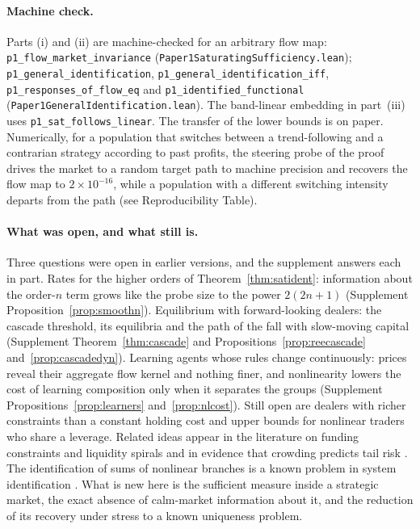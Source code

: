 \documentclass[12pt]{article}
\theoremstyle{definition}
\theoremstyle{remark}
\begin{document}
\paragraph{Machine check.} Parts (i) and (ii) are machine-checked for an arbitrary flow map: \texttt{p1\_flow\_market\_invariance} (\nolinkurl{Paper1SaturatingSufficiency.lean}); \texttt{p1\_general\_identification}, \texttt{p1\_general\_identification\_iff}, \texttt{p1\_responses\_of\_flow\_eq} and \texttt{p1\_identified\_functional} (\nolinkurl{Paper1GeneralIdentification.lean}). The band-linear embedding in part~(iii) uses \texttt{p1\_sat\_follows\_linear}. The transfer of the lower bounds is on paper. Numerically, for a population that switches between a trend-following and a contrarian strategy according to past profits, the steering probe of the proof drives the market to a random target path to machine precision and recovers the flow map to $2\times10^{-16}$, while a population with a different switching intensity departs from the path (see Reproducibility Table).

\paragraph{What was open, and what still is.} Three questions were open in earlier versions, and the supplement answers each in part. Rates for the higher orders of Theorem~\ref{thm:satident}: information about the order-$n$ term grows like the probe size to the power $2(2n+1)$ (Supplement Proposition~\ref{prop:smoothn}). Equilibrium with forward-looking dealers: the cascade threshold, its equilibria and the path of the fall with slow-moving capital (Supplement Theorem~\ref{thm:cascade} and Propositions~\ref{prop:reecascade} and~\ref{prop:cascadedyn}). Learning agents whose rules change continuously: prices reveal their aggregate flow kernel and nothing finer, and nonlinearity lowers the cost of learning composition only when it separates the groups (Supplement Propositions~\ref{prop:learners} and~\ref{prop:nlcost}). Still open are dealers with richer constraints than a constant holding cost and upper bounds for nonlinear traders who share a leverage. Related ideas appear in the literature on funding constraints and liquidity spirals \citep{brunnermeier2009} and in evidence that crowding predicts tail risk \citep{barroso2022}. The identification of sums of nonlinear branches is a known problem in system identification \citep{dreesen2017}. What is new here is the sufficient measure inside a strategic market, the exact absence of calm-market information about it, and the reduction of its recovery under stress to a known uniqueness problem.
\end{document}
